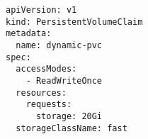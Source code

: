 \begin{verbatim}
apiVersion: v1
kind: PersistentVolumeClaim
metadata:
  name: dynamic-pvc
spec:
  accessModes:
    - ReadWriteOnce
  resources:
    requests:
      storage: 20Gi
  storageClassName: fast

\end{verbatim}
